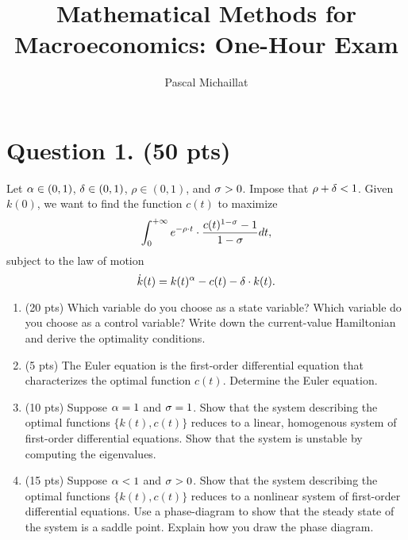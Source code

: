 \documentclass[letterpaper,12pt,leqno]{article}
\begin{document}
\title{Mathematical Methods for Macroeconomics: One-Hour Exam}
\author{Pascal Michaillat}
\date{}

\begin{titlepage}
\maketitle
\end{titlepage}

\section*{Question 1. (50 pts)}

Let $\alpha \in (0,1)$, $\delta  \in (0,1)$, $\rho \in (0,1)$, and $\sigma>0$. Impose that $\rho+\delta<1$. Given $k(0)$, we want to find the function $c(t) $ to maximize 
\begin{equation*}
\int_{0}^{+\infty }e^{-\rho\cdot  t}\cdot \frac{c(t)^{1-\sigma}-1}{1-\sigma} dt,
\end{equation*}
subject to the law of motion
\begin{equation*}
\dot{k}(t) =k(t)^{\alpha}-c(t)-\delta \cdot k(t).
\end{equation*}

\begin{enumerate}

\item (20 pts) Which variable do you choose as a state variable? Which variable do you choose as a control variable? Write down the current-value Hamiltonian and derive the optimality conditions.

\item (5 pts) The Euler equation is the first-order differential equation that characterizes the optimal function $c(t)$. Determine the Euler equation.

\item (10 pts) Suppose $\alpha =1$ and $\sigma =1$. Show that the system describing the optimal functions $\{k(t),c(t)\}$ reduces to a linear, homogenous system of first-order differential equations. Show that the system is unstable by computing the eigenvalues. 

\item (15 pts) Suppose $\alpha <1$ and $\sigma >0$. Show that the system describing the optimal functions $\{k(t),c(t)\}$ reduces to a nonlinear system of first-order differential equations. Use a phase-diagram to show that the steady state of the system is a saddle point. Explain how you draw the phase diagram.

\end{enumerate}
\end{document}

